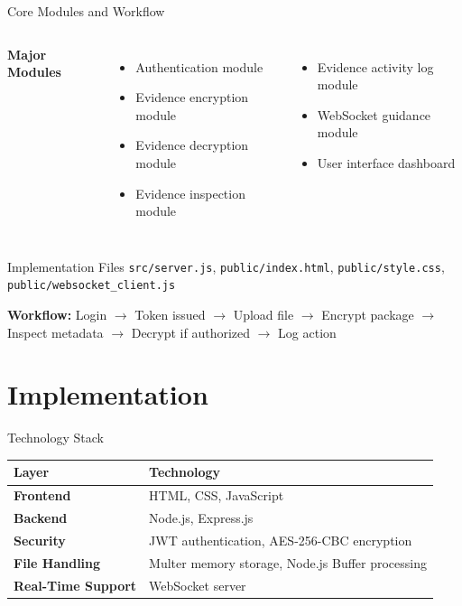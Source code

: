 \documentclass[aspectratio=169]{beamer}
\begin{document}
\begin{frame}{Core Modules and Workflow}
    \begin{columns}[T]
        \textbf{Major Modules}
        \begin{itemize}
            \item Authentication module
            \item Evidence encryption module
            \item Evidence decryption module
            \item Evidence inspection module
        \end{itemize}

        \begin{itemize}
            \item Evidence activity log module
            \item WebSocket guidance module
            \item User interface dashboard
        \end{itemize}
    \end{columns}

    \vspace{0.2cm}

    \begin{block}{Implementation Files}
        \texttt{src/server.js}, \texttt{public/index.html}, \texttt{public/style.css}, \texttt{public/websocket\_client.js}
    \end{block}
\vspace{0.1cm}
\textbf{Workflow:} Login $\rightarrow$ Token issued $\rightarrow$ Upload file $\rightarrow$ Encrypt package $\rightarrow$ Inspect metadata $\rightarrow$ Decrypt if authorized $\rightarrow$ Log action
\end{frame}

\section{Implementation}

\begin{frame}{Technology Stack}
    \begin{table}
        \centering
        \begin{tabularx}{\textwidth}{>{\bfseries}l X}
            \toprule
            Layer & Technology \\
            \midrule
            Frontend & HTML, CSS, JavaScript \\
            Backend & Node.js, Express.js \\
            Security & JWT authentication, AES-256-CBC encryption \\
            File Handling & Multer memory storage, Node.js Buffer processing \\
            Real-Time Support & WebSocket server \\
            \bottomrule
        \end{tabularx}
    \end{table}
\end{frame}
\end{document}
